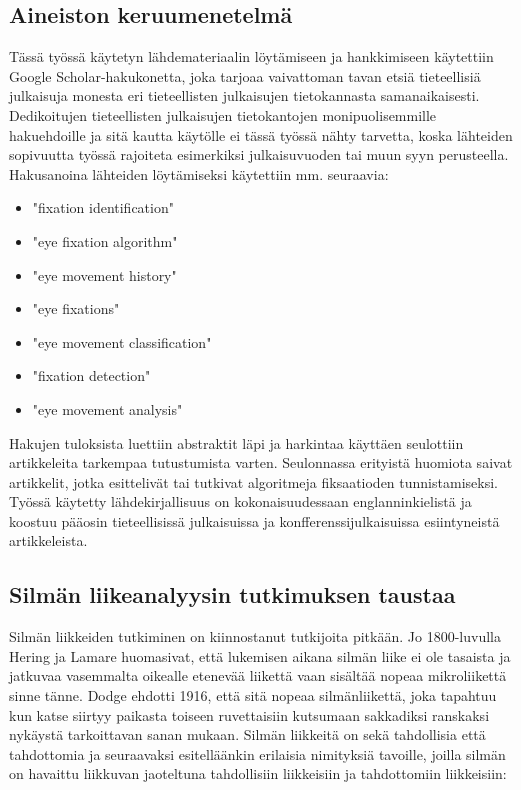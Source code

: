 \subsection{Aineiston keruumenetelmä}
Tässä työssä käytetyn lähdemateriaalin löytämiseen ja hankkimiseen käytettiin Google Scholar-hakukonetta, joka tarjoaa vaivattoman tavan etsiä tieteellisiä julkaisuja monesta eri tieteellisten julkaisujen tietokannasta samanaikaisesti. Dedikoitujen tieteellisten julkaisujen tietokantojen monipuolisemmille hakuehdoille ja sitä kautta käytölle ei tässä työssä nähty tarvetta, koska lähteiden sopivuutta työssä rajoiteta esimerkiksi julkaisuvuoden tai muun syyn perusteella.
Hakusanoina lähteiden löytämiseksi käytettiin mm. seuraavia:

\begin{itemize}
	\item "fixation identification"
	\item "eye fixation algorithm"
	\item "eye movement history"
	\item "eye fixations"
	\item "eye movement classification"
	\item "fixation detection"
	\item "eye movement analysis"
\end{itemize}

Hakujen tuloksista luettiin abstraktit läpi ja harkintaa käyttäen seulottiin artikkeleita tarkempaa tutustumista varten. Seulonnassa erityistä huomiota saivat artikkelit, jotka esittelivät tai tutkivat algoritmeja fiksaatioden tunnistamiseksi. Työssä käytetty lähdekirjallisuus on kokonaisuudessaan englanninkielistä ja koostuu pääosin tieteellisissä julkaisuissa ja konfferenssijulkaisuissa esiintyneistä artikkeleista.


\subsection{Silmän liikeanalyysin tutkimuksen taustaa}

Silmän liikkeiden tutkiminen on kiinnostanut tutkijoita pitkään. Jo 1800-luvulla Hering ja Lamare huomasivat, että lukemisen aikana silmän liike ei ole tasaista ja jatkuvaa vasemmalta oikealle etenevää liikettä vaan sisältää nopeaa mikroliikettä sinne tänne. Dodge ehdotti 1916, että sitä nopeaa silmänliikettä, joka tapahtuu kun katse siirtyy paikasta toiseen ruvettaisiin kutsumaan sakkadiksi ranskaksi nykäystä tarkoittavan sanan mukaan.\citep[s.793]{wade2003dodge} Silmän liikkeitä on sekä tahdollisia että tahdottomia ja seuraavaksi esitelläänkin erilaisia nimityksiä tavoille, joilla silmän on havaittu liikkuvan jaoteltuna tahdollisiin liikkeisiin ja tahdottomiin liikkeisiin:

